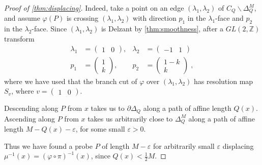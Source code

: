 \documentclass[12pt,a4paper,abstract=true,draft]{scrartcl}
\newcommand\mqty[1]{\begin{pmatrix}#1\end{pmatrix}}
\begin{document}
\begin{proof}[Proof of \cref{thm:displacing}]
  Indeed, take a point on an edge $(λ_1,λ_2)$ of $C_Q ∖ Δ_Q^M$, and assume $φ(P)$ is crossing $(λ_1,λ_2)$ with direction $p_1$ in the $λ_1$-face and $p_2$ in the $λ_2$-face.
  Since $(λ_1,λ_2)$ is Delzant by \cref{thm:smoothness}, after a $GL(2,ℤ)$ transform
  \begin{align*}
    λ_1 &= \mqty{1 & 0} , & λ_2 &= \mqty{-1 & 1} \\
    p_1 &= \mqty{1 \\ k} , & p_2 &= \mqty{1-k \\ k} \; ,
  \end{align*}
  where we have used that the branch cut of $φ$ over $(λ_1,λ_2)$ has resolution map $S_v$, where $v = \mqty{1 & 0}$.

  Descending along $P$ from $x$ takes us to $∂Δ_Q$ along a path of affine length $Q(x)$.
  Ascending along $P$ from $x$ takes us arbitrarily close to $Δ_Q^M$ along a path of affine length $M-Q(x)-ε$, for some small $ε>0$.

  Thus we have found a probe $P$ of length $M-ε$ for arbitrarily small $ε$ displacing $μ^{-1}(x) = (φ∘π)^{-1}(x)$, since $Q(x) < \frac{1}{2}M$.
\end{proof}
\end{document}
